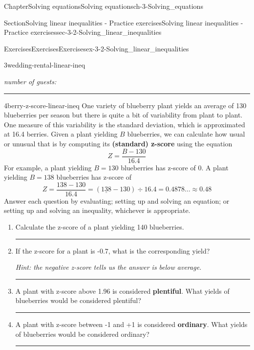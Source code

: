\documentclass[twoside,11pt,]{book}
\newcommand{\terminology}[1]{\textbf{#1}}
\newlength{\workspacestrutwidth}
\numberwithin{equation}{section}
\begin{document}
\begin{chapterptx}{Chapter}{Solving equations}{}{Solving equations}{}{}{ch-3-Solving_equations}
\begin{sectionptx}{Section}{Solving linear inequalities - Practice exercises}{}{Solving linear inequalities - Practice exercises}{}{}{sec-3-2-Solving_linear_inequalities}
\begin{exercises-subsection-numberless}{Exercises}{Exercises}{}{Exercises}{}{}{ex-3-2-Solving_linear_inequalities}
\begin{divisionexercise}{3}{}{}{wedding-rental-linear-ineq}
\begin{enumerate}[label=(\alph*),ref=\alph*]
\emph{number of guests:}%
\par\rule{\workspacestrutwidth}{0.5cm}%
\end{enumerate}%
\end{divisionexercise}%
\clearpage
\begin{divisionexercise}{4}{}{}{berry-z-score-linear-ineq}%
One variety of blueberry plant yields an average of 130 blueberries per season but there is quite a bit of variability from plant to plant. One measure of this variability is the standard deviation, which is approximated at 16.4 berries. Given a plant yielding \(B\) blueberries, we can calculate how usual or unusual that is by computing its \terminology{(standard) z-score} using the equation%
\begin{equation*}
Z = \frac{B-130}{16.4}
\end{equation*}
For example, a plant yielding \(B=130\) blueberries has z-score of 0. A plant yielding \(B = 138\) blueberries has z-score of%
\begin{equation*}
Z=\frac{138-130}{16.4} = (\underline{138}-130)\div 16.4 = 0.4878\ldots \approx 0.48
\end{equation*}
Answer each question by evaluating; setting up and solving an equation; or setting up and solving an inequality, whichever is appropriate.%
\begin{enumerate}[label=(\alph*),ref=\alph*]%
\item{}Calculate the z-score of a plant yielding 140 blueberries.%
\par\rule{\workspacestrutwidth}{0.9in}%
\item{}If the z-score for a plant is -0.7, what is the corresponding yield?%
\par
\emph{Hint: the negative z-score tells us the answer is below average.}%
\par\rule{\workspacestrutwidth}{0.9in}%
\item{}A plant with z-score above 1.96 is considered \terminology{plentiful}. What yields of blueberries would be considered plentiful?%
\par\rule{\workspacestrutwidth}{0.9in}%
\item{}A plant with z-score between -1 and +1 is considered \terminology{ordinary}. What yields of blueberries would be considered ordinary?%
\par\rule{\workspacestrutwidth}{0.9in}%
\end{enumerate}%
\end{divisionexercise}%
\end{exercises-subsection-numberless}

\end{sectionptx}
\end{chapterptx}
\end{document}
